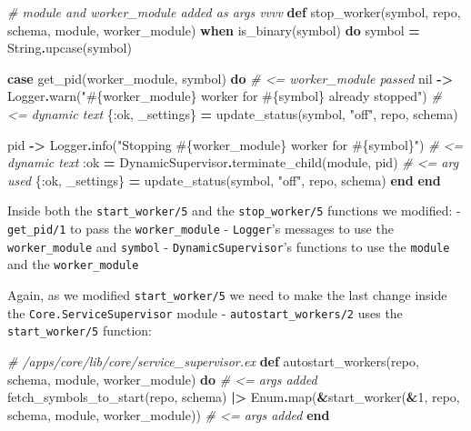 \documentclass[
]{book}
\newenvironment{Shaded}{\begin{snugshade}}{\end{snugshade}}
\newcommand{\CommentTok}[1]{\textcolor[rgb]{0.56,0.35,0.01}{\textit{#1}}}
\newcommand{\ConstantTok}[1]{\textcolor[rgb]{0.00,0.00,0.00}{#1}}
\newcommand{\DecValTok}[1]{\textcolor[rgb]{0.00,0.00,0.81}{#1}}
\newcommand{\KeywordTok}[1]{\textcolor[rgb]{0.13,0.29,0.53}{\textbf{#1}}}
\newcommand{\NormalTok}[1]{#1}
\newcommand{\OperatorTok}[1]{\textcolor[rgb]{0.81,0.36,0.00}{\textbf{#1}}}
\newcommand{\OtherTok}[1]{\textcolor[rgb]{0.56,0.35,0.01}{#1}}
\newcommand{\StringTok}[1]{\textcolor[rgb]{0.31,0.60,0.02}{#1}}
\newcommand{\VariableTok}[1]{\textcolor[rgb]{0.00,0.00,0.00}{#1}}
\begin{document}
\begin{Shaded}
\begin{Highlighting}[]
  \CommentTok{\# module and worker\_module added as args vvvv}
  \KeywordTok{def}\NormalTok{ stop\_worker(symbol, repo, schema, module, worker\_module)}
      \KeywordTok{when}\NormalTok{ is\_binary(symbol) }\KeywordTok{do}
\NormalTok{    symbol }\OperatorTok{=} \ConstantTok{String}\OperatorTok{.}\NormalTok{upcase(symbol)}

    \KeywordTok{case}\NormalTok{ get\_pid(worker\_module, symbol) }\KeywordTok{do} \CommentTok{\# \textless{}= worker\_module passed}
      \ConstantTok{nil} \OperatorTok{{-}\textgreater{}}
        \ConstantTok{Logger}\OperatorTok{.}\NormalTok{warn(}\StringTok{"}\OtherTok{\#\{}\NormalTok{worker\_module}\OtherTok{\}}\StringTok{ worker for }\OtherTok{\#\{}\NormalTok{symbol}\OtherTok{\}}\StringTok{ already stopped"}\NormalTok{) }\CommentTok{\# \textless{}= dynamic text}
\NormalTok{        \{}\VariableTok{:ok}\NormalTok{, \_settings\} }\OperatorTok{=}\NormalTok{ update\_status(symbol, }\StringTok{"off"}\NormalTok{, repo, schema)}

\NormalTok{      pid }\OperatorTok{{-}\textgreater{}}
        \ConstantTok{Logger}\OperatorTok{.}\NormalTok{info(}\StringTok{"Stopping }\OtherTok{\#\{}\NormalTok{worker\_module}\OtherTok{\}}\StringTok{ worker for }\OtherTok{\#\{}\NormalTok{symbol}\OtherTok{\}}\StringTok{"}\NormalTok{) }\CommentTok{\# \textless{}= dynamic text}
        \VariableTok{:ok} \OperatorTok{=} \ConstantTok{DynamicSupervisor}\OperatorTok{.}\NormalTok{terminate\_child(module, pid) }\CommentTok{\# \textless{}= arg used}
\NormalTok{        \{}\VariableTok{:ok}\NormalTok{, \_settings\} }\OperatorTok{=}\NormalTok{ update\_status(symbol, }\StringTok{"off"}\NormalTok{, repo, schema)}
    \KeywordTok{end}
  \KeywordTok{end}
\end{Highlighting}
\end{Shaded}

Inside both the \texttt{start\_worker/5} and the \texttt{stop\_worker/5} functions we modified:
- \texttt{get\_pid/1} to pass the \texttt{worker\_module}
- \texttt{Logger}'s messages to use the \texttt{worker\_module} and \texttt{symbol}
- \texttt{DynamicSupervisor}'s functions to use the \texttt{module} and the \texttt{worker\_module}

Again, as we modified \texttt{start\_worker/5} we need to make the last change inside the \texttt{Core.ServiceSupervisor} module - \texttt{autostart\_workers/2} uses the \texttt{start\_worker/5} function:

\begin{Shaded}
\begin{Highlighting}[]
  \CommentTok{\# /apps/core/lib/core/service\_supervisor.ex}
  \KeywordTok{def}\NormalTok{ autostart\_workers(repo, schema, module, worker\_module) }\KeywordTok{do} \CommentTok{\# \textless{}= args added}
\NormalTok{    fetch\_symbols\_to\_start(repo, schema)}
    \OperatorTok{|\textgreater{}} \ConstantTok{Enum}\OperatorTok{.}\NormalTok{map(}\OperatorTok{\&}\NormalTok{start\_worker(}\OperatorTok{\&}\DecValTok{1}\NormalTok{, repo, schema, module, worker\_module)) }\CommentTok{\# \textless{}= args added}
  \KeywordTok{end}
\end{Highlighting}
\end{Shaded}
\end{document}
